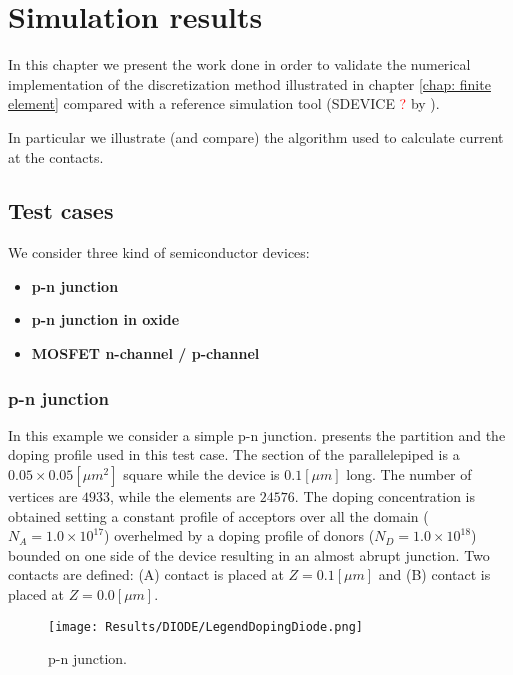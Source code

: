 \chapter{Simulation results}

In this chapter we present the work done in order to validate the numerical implementation of the discretization method illustrated in chapter \ref{chap: finite element} compared with a reference simulation tool (SDEVICE \textcolor{red}{?} by \cite{SdeviceManual}).

In particular we illustrate (and compare) the algorithm used to calculate current at the contacts.

\section{Test cases}

We consider three kind of semiconductor devices: 

\begin{itemize}
\item {\bf p-n junction}
\item {\bf p-n junction in oxide}
\item {\bf MOSFET n-channel / p-channel}
\end{itemize}

\subsection{p-n junction}
\label{sec: PN}

In this example we consider a simple p-n junction.  presents the partition and the doping profile used in this test case. The section of the parallelepiped is a $0.05 \times 0.05 [\mu m^2]$ square while the device is $0.1 [\mu m]$ long.  The number of vertices are $4933$, while the elements are $24576$.  The doping concentration is obtained setting a constant profile of acceptors over all the domain ($N_A = 1.0\times 10^{17}$) overhelmed by a doping profile of  donors ($N_D=1.0 \times 10^{18}$) bounded on one side of the device resulting in an almost abrupt junction. 
Two contacts are defined: (A) contact is placed at $Z=0.1[\mu m]$ and (B) contact is placed at $Z=0.0 [\mu m]$.  


\begin{figure}[!t]
\centering
{}
\hspace{0.06\textwidth}
\hspace{0.04\textwidth}
{\texttt{[image: Results/DIODE/LegendDopingDiode.png]}}
\caption{p-n junction.}
\label{fig: diodo struttura}
\end{figure}


